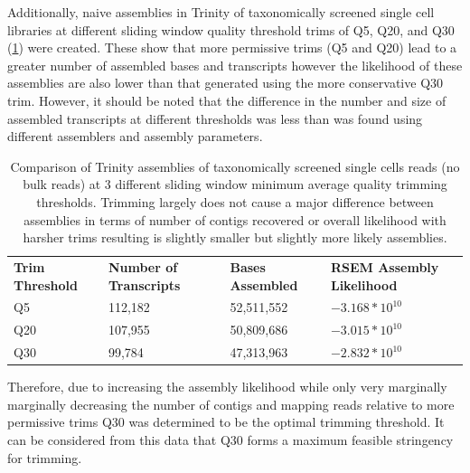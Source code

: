 Additionally, naive assemblies in Trinity of taxonomically screened single cell libraries
at different sliding window quality threshold trims of Q5, Q20, and Q30 (\ref{tab:trim_assembly})
were created. 
These show that more permissive trims (Q5 and Q20) lead to a greater number of assembled bases and transcripts 
however the likelihood of these assemblies are also lower than that generated using the 
more conservative Q30 trim. 
However, it should be noted that the difference in the number and size of assembled transcripts at different thresholds 
was less than was found using different assemblers and assembly parameters.

\begin{table}[h]
     \begin{tabular}{@{}|l||l|l|l|@{}}
         \cmidrule(r){1-6} \cmidrule(l){8-8}
         \textbf{Trim Threshold} & \textbf{Number of Transcripts} & \textbf{Bases Assembled} & \textbf{RSEM Assembly Likelihood} \\
         \cmidrule{}
         Q5 &  112,182 & 52,511,552 & \(-3.168*10^{10}\) \\
         Q20 & 107,955 & 50,809,686 & \(-3.015*10^{10}\) \\
         Q30 & 99,784 & 47,313,963 &  \(-2.832*10^{10}\) \\ 
    \end{tabular}
    \caption{Comparison of Trinity assemblies of taxonomically screened
        single cells reads (no bulk reads) at 3 different sliding window
        minimum average quality trimming thresholds.  Trimming largely
        does not cause a major difference between assemblies in terms of number
        of contigs recovered or overall likelihood with harsher trims resulting
        is slightly smaller but slightly more likely assemblies.
    }
    \label{tab:trim_assembly}
\end{table}

Therefore, due to increasing the assembly likelihood while only very marginally
marginally decreasing the number of contigs and mapping reads relative to
more permissive trims Q30 was determined to be the optimal trimming threshold.
It can be considered from this data that Q30 forms a maximum feasible stringency for trimming. 

